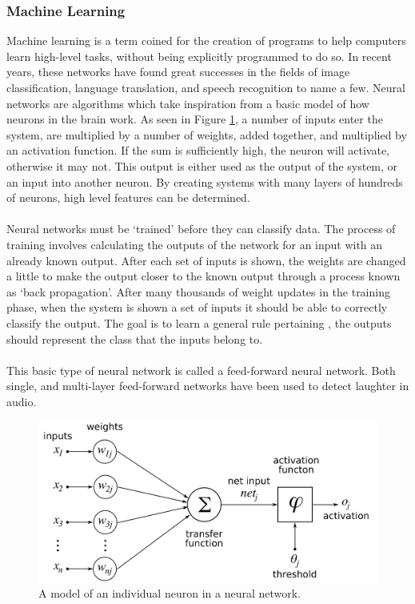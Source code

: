 \documentclass[a4paper,11pt,notitlepage]{article}
\begin{document}
\subsubsection{Machine Learning}

Machine learning is a term coined for the creation of programs to help computers learn high-level tasks, without being explicitly programmed to do so. In recent years, these networks have found great successes in the fields of image classification\cite{ciregan2012multi}, language translation\cite{bahdanau2014neural}, and speech recognition\cite{graves2013speech} to name a few. Neural networks are algorithms which take inspiration from a basic model of how neurons in the brain work. As seen in Figure \ref{artificial_neuron}, a number of inputs enter the system, are multiplied by a number of weights, added together, and multiplied by an activation function. If the sum is sufficiently high, the neuron will activate, otherwise it may not. This output is either used as the output of the system, or an input into another neuron. By creating systems with many layers of hundreds of neurons, high level features can be determined.\\
\\
Neural networks must be `trained' before they can classify data. The process of training involves calculating the outputs of the network for an input with an already known output. After each set of inputs is shown, the weights are changed a little to make the output closer to the known output through a process known as `back propagation'. After many thousands of weight updates in the training phase, when the system is shown a set of inputs it should be able to correctly classify the output. The goal is to learn a general rule pertaining , the outputs should represent the class that the inputs belong to.\\
\\
This basic type of neural network is called a feed-forward neural network. Both single, and multi-layer feed-forward networks have been used to detect laughter in audio.\cite{knox2007automatic,gosztolya2016laughter}


\begin{figure}[H]
	\centering
	\includegraphics[scale = 0.2]{figs/artificial_neuron.png}
	\caption{A model of an individual neuron in a neural network.}
	\label{artificial_neuron}
\end{figure}
\end{document}
